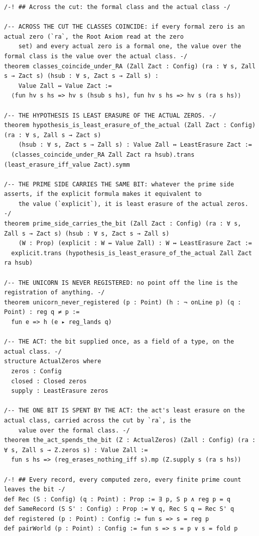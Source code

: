 \documentclass[10pt,twocolumn]{article}
\begin{document}
\begin{Verbatim}
/-! ## Across the cut: the formal class and the actual class -/

/-- ACROSS THE CUT THE CLASSES COINCIDE: if every formal zero is an actual zero (`ra`, the Root Axiom read at the zero
    set) and every actual zero is a formal one, the value over the formal class is the value over the actual class. -/
theorem classes_coincide_under_RA (Zall Zact : Config) (ra : ∀ s, Zall s → Zact s) (hsub : ∀ s, Zact s → Zall s) :
    Value Zall ↔ Value Zact :=
  ⟨fun hv s hs => hv s (hsub s hs), fun hv s hs => hv s (ra s hs)⟩

/-- THE HYPOTHESIS IS LEAST ERASURE OF THE ACTUAL ZEROS. -/
theorem hypothesis_is_least_erasure_of_the_actual (Zall Zact : Config) (ra : ∀ s, Zall s → Zact s)
    (hsub : ∀ s, Zact s → Zall s) : Value Zall ↔ LeastErasure Zact :=
  (classes_coincide_under_RA Zall Zact ra hsub).trans (least_erasure_iff_value Zact).symm

/-- THE PRIME SIDE CARRIES THE SAME BIT: whatever the prime side asserts, if the explicit formula makes it equivalent to
    the value (`explicit`), it is least erasure of the actual zeros. -/
theorem prime_side_carries_the_bit (Zall Zact : Config) (ra : ∀ s, Zall s → Zact s) (hsub : ∀ s, Zact s → Zall s)
    (W : Prop) (explicit : W ↔ Value Zall) : W ↔ LeastErasure Zact :=
  explicit.trans (hypothesis_is_least_erasure_of_the_actual Zall Zact ra hsub)

/-- THE UNICORN IS NEVER REGISTERED: no point off the line is the registration of anything. -/
theorem unicorn_never_registered (p : Point) (h : ¬ onLine p) (q : Point) : reg q ≠ p :=
  fun e => h (e ▸ reg_lands q)

/-- THE ACT: the bit supplied once, as a field of a type, on the actual class. -/
structure ActualZeros where
  zeros : Config
  closed : Closed zeros
  supply : LeastErasure zeros

/-- THE ONE BIT IS SPENT BY THE ACT: the act's least erasure on the actual class, carried across the cut by `ra`, is the
    value over the formal class. -/
theorem the_act_spends_the_bit (Z : ActualZeros) (Zall : Config) (ra : ∀ s, Zall s → Z.zeros s) : Value Zall :=
  fun s hs => (reg_erases_nothing_iff s).mp (Z.supply s (ra s hs))

/-! ## Every record, every computed zero, every finite prime count leaves the bit -/
def Rec (S : Config) (q : Point) : Prop := ∃ p, S p ∧ reg p = q
def SameRecord (S S' : Config) : Prop := ∀ q, Rec S q ↔ Rec S' q
def registered (p : Point) : Config := fun s => s = reg p
def pairWorld (p : Point) : Config := fun s => s = p ∨ s = fold p


\end{Verbatim}
\end{document}
